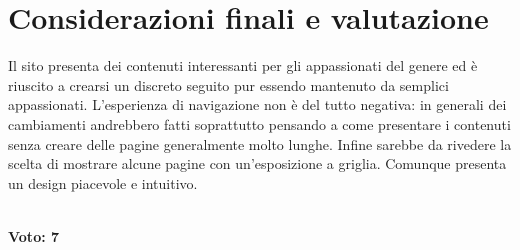 \documentclass[../ProgettoTecWeb2.tex]{subfiles}
\begin{document}
\section{Considerazioni finali e valutazione}
Il sito presenta dei contenuti interessanti per gli appassionati del genere ed è riuscito a crearsi un discreto seguito pur essendo mantenuto da semplici appassionati. L'esperienza di navigazione non è del tutto negativa: in generali dei cambiamenti andrebbero fatti soprattutto pensando a come presentare i contenuti senza creare delle pagine generalmente molto lunghe. Infine sarebbe da rivedere la scelta di mostrare alcune pagine con un'esposizione a griglia. Comunque presenta un design piacevole e intuitivo. \\ \\
\centerline{\textbf{Voto: 7}}
\end{document}
